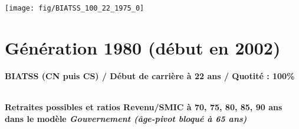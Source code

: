  \vspace{0.1cm} 

 {\hspace{-2.2cm}\texttt{[image: fig/BIATSS\_100\_22\_1975\_0]}} 

\newpage 
 
\section{Génération 1980 (début en 2002)\label{BIATSS_100_22_1980_0}} 
 
{\bf \noindent BIATSS (CN puis CS) / Début de carrière à 22 ans / Quotité : 100\%}  ~ 

 ~\\{\bf \noindent Retraites possibles et ratios Revenu/SMIC à 70, 75, 80, 85, 90 ans dans le modèle \emph{Gouvernement (âge-pivot bloqué à 65 ans)}}  
 
